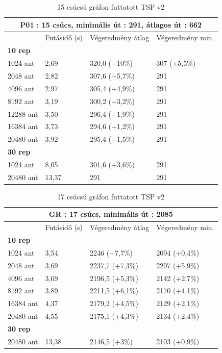 \begin{table}[ht!]
	\centering
	\begin{tabular}{|p{2cm}||p{3cm}|p{3.5cm}|p{3.5cm}|}
		\hline
		\multicolumn{4}{|c|}{P01 : 15 csúcs, minimális út : 291, átlagos út : 662} \\
		\hline
		& Futásidő (s) & Végeredmény átlag & Végeredmény min.\\
		\hline
		\textbf{10 rep} & & &\\
		1024 ant & 2,69 & 320,0 (+10\%) & 307 (+5,5\%) \\
		2048 ant & 2,82 & 307,6 (+5,7\%) & 291\\
		4096 ant & 2,97 & 305,4 (+4,9\%) & 291\\
		8192 ant & 3,19 & 300,2 (+3,2\%) & 291\\
		12288 ant & 3,50 & 296,4 (+1,9\%) & 291\\
		16384 ant & 3,73 & 294,6 (+1,2\%) & 291\\
		20480 ant & 3,92 & 295,4 (+1,5\%) & 291\\
		\hline
		\textbf{30 rep} & & &\\
		1024 ant & 8,05 & 301,6 (+3,6\%) & 291\\
		20480 ant & 13,37 & 291 & 291\\
		\hline
	\end{tabular}
	\caption{15 csúcsú gráfon futtatott TSP v2}
	\label{table:TSPv2_15}
\end{table}

\begin{table}[ht!]
	\centering
	\begin{tabular}{|p{2cm}||p{3cm}|p{3.5cm}|p{3.5cm}|}
		\hline
		\multicolumn{4}{|c|}{GR : 17 csúcs, minimális út : 2085} \\
		\hline
		& Futásidő (s) & Végeredmény átlag & Végeredmény min.\\
		\hline
		\textbf{10 rep} & & & \\
		1024 ant & 3,54 & 2246 (+7,7\%) & 2094 (+0,4\%)\\
		2048 ant & 3,69 & 2237,7 (+7,3\%) & 2207 (+5,9\%)\\
		4096 ant & 3,69 & 2196,5 (+5,3\%) & 2142 (+2,7\%)\\
		8192 ant & 3,89 & 2211,5 (+6,1\%) & 2170 (+4,1\%)\\
		16384 ant & 4,37 & 2179,2 (+4,5\%) & 2129 (+2,1\%)\\
		20480 ant & 4,55 & 2175,1 (+4,3\%) & 2134 (+2,4\%) \\
		\hline
		\textbf{30 rep} & & & \\
		20480 ant & 13,38 & 2146,5 (+3\%) & 2103 (+0,9\%) \\
		\hline
	\end{tabular}
	\caption{17 csúcsú gráfon futtatott TSP v2}
	\label{table:TSPv2_17}
\end{table}

